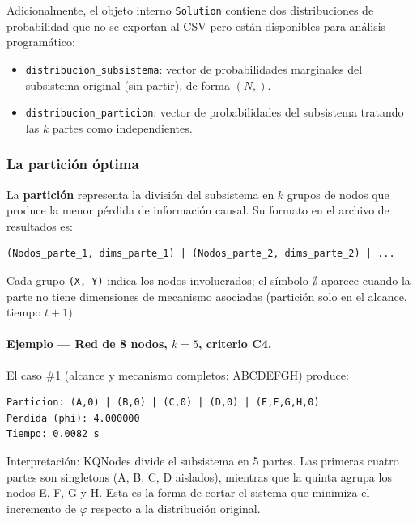 Adicionalmente, el objeto interno \texttt{Solution} contiene dos distribuciones de
probabilidad que no se exportan al CSV pero están disponibles para análisis programático:

\begin{itemize}
  \item \texttt{distribucion\_subsistema}: vector de probabilidades marginales del
        subsistema original (sin partir), de forma $(N,)$.
  \item \texttt{distribucion\_particion}: vector de probabilidades del subsistema
        tratando las $k$ partes como independientes.
\end{itemize}

\subsubsection{La partición óptima}

La \textbf{partición} representa la división del subsistema en $k$ grupos de nodos
que produce la menor pérdida de información causal. Su formato en el archivo de
resultados es:

\begin{lstlisting}
(Nodos_parte_1, dims_parte_1) | (Nodos_parte_2, dims_parte_2) | ...
\end{lstlisting}

Cada grupo \texttt{(X,\,Y)} indica los nodos involucrados; el símbolo $\emptyset$
aparece cuando la parte no tiene dimensiones de mecanismo asociadas (partición solo
en el alcance, tiempo $t+1$).

\paragraph{Ejemplo — Red de 8 nodos, $k=5$, criterio C4.}

El caso \#1 (alcance y mecanismo completos: ABCDEFGH) produce:

\begin{lstlisting}
Particion: (A,0) | (B,0) | (C,0) | (D,0) | (E,F,G,H,0)
Perdida (phi): 4.000000
Tiempo: 0.0082 s
\end{lstlisting}

Interpretación: KQNodes divide el subsistema en 5 partes. Las primeras cuatro partes
son singletons (A, B, C, D aislados), mientras que la quinta agrupa los nodos E, F, G
y H. Esta es la forma de cortar el sistema que minimiza el incremento de $\varphi$
respecto a la distribución original.

